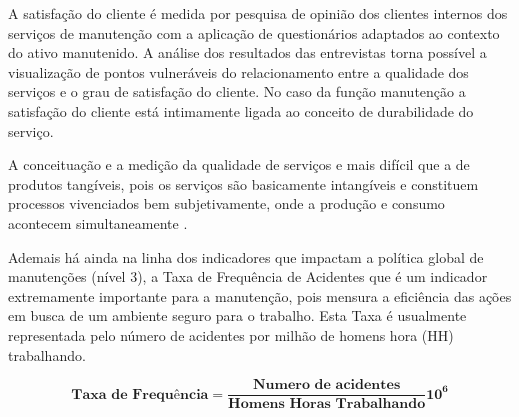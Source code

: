 A satisfação do cliente é medida por pesquisa de opinião dos clientes internos dos serviços de manutenção com a aplicação de questionários adaptados ao contexto do ativo manutenido. A análise dos resultados das entrevistas torna possível a visualização de pontos vulneráveis do  relacionamento entre a qualidade dos serviços e o grau de satisfação do cliente. No caso da função manutenção a satisfação do cliente está intimamente ligada ao conceito de durabilidade do serviço.

A conceituação e a medição da qualidade de serviços e mais difícil que a de produtos tangíveis, pois os serviços são basicamente intangíveis e constituem processos vivenciados bem subjetivamente, onde a produção e consumo acontecem simultaneamente \cite{junior2012satisfaccao}.

Ademais há ainda na linha dos indicadores que impactam a política global de manutenções (nível 3), a Taxa de Frequência de Acidentes que é um indicador extremamente importante para a manutenção, pois mensura a eficiência das ações em busca de um ambiente seguro para o trabalho. Esta Taxa é usualmente representada pelo número de acidentes por milhão de homens hora (HH) trabalhando.

\begin{equation}
\label{eqn07}
	\mathbf{\textrm{Taxa de Frequência}} = \mathbf{\frac{\textrm{Numero de acidentes}}{\textrm{Homens Horas Trabalhando}}{10^6}} 
\end{equation}
